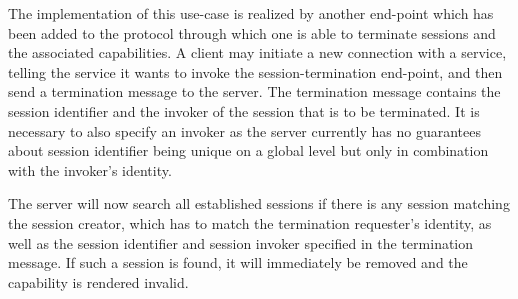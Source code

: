 The implementation of this use-case is realized by another end-point which has been added to the protocol through which one is able to terminate sessions and the associated capabilities.
A client may initiate a new connection with a service, telling the service it wants to invoke the session-termination end-point, and then send a termination message to the server.
The termination message contains the session identifier and the invoker of the session that is to be terminated.
It is necessary to also specify an invoker as the server currently has no guarantees about session identifier being unique on a global level but only in combination with the invoker's identity.

The server will now search all established sessions if there is any session matching the session creator, which has to match the termination requester's identity, as well as the session identifier and session invoker specified in the termination message.
If such a session is found, it will immediately be removed and the capability is rendered invalid.

